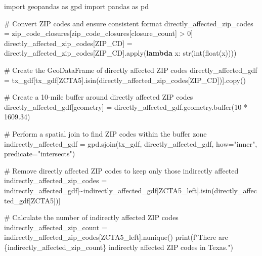 \documentclass[
  letterpaper,
  DIV=11,
  numbers=noendperiod]{scrartcl}
\newenvironment{Shaded}{\begin{snugshade}}{\end{snugshade}}
\newcommand{\BuiltInTok}[1]{\textcolor[rgb]{0.00,0.23,0.31}{#1}}
\newcommand{\CommentTok}[1]{\textcolor[rgb]{0.37,0.37,0.37}{#1}}
\newcommand{\DecValTok}[1]{\textcolor[rgb]{0.68,0.00,0.00}{#1}}
\newcommand{\FloatTok}[1]{\textcolor[rgb]{0.68,0.00,0.00}{#1}}
\newcommand{\ImportTok}[1]{\textcolor[rgb]{0.00,0.46,0.62}{#1}}
\newcommand{\KeywordTok}[1]{\textcolor[rgb]{0.00,0.23,0.31}{\textbf{#1}}}
\newcommand{\NormalTok}[1]{\textcolor[rgb]{0.00,0.23,0.31}{#1}}
\newcommand{\OperatorTok}[1]{\textcolor[rgb]{0.37,0.37,0.37}{#1}}
\newcommand{\SpecialCharTok}[1]{\textcolor[rgb]{0.37,0.37,0.37}{#1}}
\newcommand{\SpecialStringTok}[1]{\textcolor[rgb]{0.13,0.47,0.30}{#1}}
\newcommand{\StringTok}[1]{\textcolor[rgb]{0.13,0.47,0.30}{#1}}
\begin{document}
\begin{Shaded}
\begin{Highlighting}[]
\ImportTok{import}\NormalTok{ geopandas }\ImportTok{as}\NormalTok{ gpd}
\ImportTok{import}\NormalTok{ pandas }\ImportTok{as}\NormalTok{ pd}

\CommentTok{\# Convert ZIP codes and ensure consistent format}
\NormalTok{directly\_affected\_zip\_codes }\OperatorTok{=}\NormalTok{ zip\_code\_closures[zip\_code\_closures[}\StringTok{\textquotesingle{}closure\_count\textquotesingle{}}\NormalTok{] }\OperatorTok{\textgreater{}} \DecValTok{0}\NormalTok{]}
\NormalTok{directly\_affected\_zip\_codes[}\StringTok{\textquotesingle{}ZIP\_CD\textquotesingle{}}\NormalTok{] }\OperatorTok{=}\NormalTok{ directly\_affected\_zip\_codes[}\StringTok{\textquotesingle{}ZIP\_CD\textquotesingle{}}\NormalTok{].}\BuiltInTok{apply}\NormalTok{(}\KeywordTok{lambda}\NormalTok{ x: }\BuiltInTok{str}\NormalTok{(}\BuiltInTok{int}\NormalTok{(}\BuiltInTok{float}\NormalTok{(x))))}

\CommentTok{\# Create the GeoDataFrame of directly affected ZIP codes}
\NormalTok{directly\_affected\_gdf }\OperatorTok{=}\NormalTok{ tx\_gdf[tx\_gdf[}\StringTok{\textquotesingle{}ZCTA5\textquotesingle{}}\NormalTok{].isin(directly\_affected\_zip\_codes[}\StringTok{\textquotesingle{}ZIP\_CD\textquotesingle{}}\NormalTok{])].copy()}

\CommentTok{\# Create a 10{-}mile buffer around directly affected ZIP codes}
\NormalTok{directly\_affected\_gdf[}\StringTok{\textquotesingle{}geometry\textquotesingle{}}\NormalTok{] }\OperatorTok{=}\NormalTok{ directly\_affected\_gdf.geometry.}\BuiltInTok{buffer}\NormalTok{(}\DecValTok{10} \OperatorTok{*} \FloatTok{1609.34}\NormalTok{)  }

\CommentTok{\# Perform a spatial join to find ZIP codes within the buffer zone}
\NormalTok{indirectly\_affected\_gdf }\OperatorTok{=}\NormalTok{ gpd.sjoin(tx\_gdf, directly\_affected\_gdf, how}\OperatorTok{=}\StringTok{"inner"}\NormalTok{, predicate}\OperatorTok{=}\StringTok{"intersects"}\NormalTok{)}

\CommentTok{\# Remove directly affected ZIP codes to keep only those indirectly affected}
\NormalTok{indirectly\_affected\_zip\_codes }\OperatorTok{=}\NormalTok{ indirectly\_affected\_gdf[}\OperatorTok{\textasciitilde{}}\NormalTok{indirectly\_affected\_gdf[}\StringTok{\textquotesingle{}ZCTA5\_left\textquotesingle{}}\NormalTok{].isin(directly\_affected\_gdf[}\StringTok{\textquotesingle{}ZCTA5\textquotesingle{}}\NormalTok{])]}

\CommentTok{\# Calculate the number of indirectly affected ZIP codes}
\NormalTok{indirectly\_affected\_zip\_count }\OperatorTok{=}\NormalTok{ indirectly\_affected\_zip\_codes[}\StringTok{\textquotesingle{}ZCTA5\_left\textquotesingle{}}\NormalTok{].nunique()}
\BuiltInTok{print}\NormalTok{(}\SpecialStringTok{f"There are }\SpecialCharTok{\{}\NormalTok{indirectly\_affected\_zip\_count}\SpecialCharTok{\}}\SpecialStringTok{ indirectly affected ZIP codes in Texas."}\NormalTok{)}
\end{Highlighting}
\end{Shaded}
\end{document}
